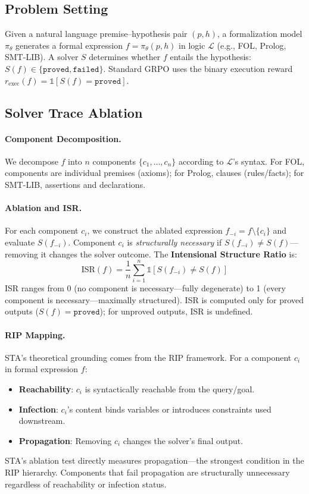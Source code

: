 \documentclass[11pt,a4paper]{article}
\begin{document}
\subsection{Problem Setting}

Given a natural language premise--hypothesis pair $(p, h)$, a formalization model $\pi_\theta$ generates a formal expression $f = \pi_\theta(p, h)$ in logic $\mathcal{L}$ (e.g., FOL, Prolog, SMT-LIB). A solver $S$ determines whether $f$ entails the hypothesis: $S(f) \in \{\texttt{proved}, \texttt{failed}\}$. Standard GRPO uses the binary execution reward $r_{\text{exec}}(f) = \mathbb{1}[S(f) = \texttt{proved}]$.

\subsection{Solver Trace Ablation}

\paragraph{Component Decomposition.}
We decompose $f$ into $n$ components $\{c_1, \ldots, c_n\}$ according to $\mathcal{L}$'s syntax. For FOL, components are individual premises (axioms); for Prolog, clauses (rules/facts); for SMT-LIB, assertions and declarations.

\paragraph{Ablation and ISR.}
For each component $c_i$, we construct the ablated expression $f_{-i} = f \setminus \{c_i\}$ and evaluate $S(f_{-i})$. Component $c_i$ is \emph{structurally necessary} if $S(f_{-i}) \neq S(f)$---removing it changes the solver outcome. The \textbf{Intensional Structure Ratio} is:
\begin{equation}
\text{ISR}(f) = \frac{1}{n} \sum_{i=1}^{n} \mathbb{1}[S(f_{-i}) \neq S(f)]
\label{eq:isr}
\end{equation}
ISR ranges from 0 (no component is necessary---fully degenerate) to 1 (every component is necessary---maximally structured). ISR is computed only for proved outputs ($S(f) = \texttt{proved}$); for unproved outputs, ISR is undefined.

\paragraph{RIP Mapping.}
STA's theoretical grounding comes from the RIP framework. For a component $c_i$ in formal expression $f$:
\begin{itemize}
\item \textbf{Reachability}: $c_i$ is syntactically reachable from the query/goal.
\item \textbf{Infection}: $c_i$'s content binds variables or introduces constraints used downstream.
\item \textbf{Propagation}: Removing $c_i$ changes the solver's final output.
\end{itemize}
STA's ablation test directly measures propagation---the strongest condition in the RIP hierarchy. Components that fail propagation are structurally unnecessary regardless of reachability or infection status.
\end{document}
